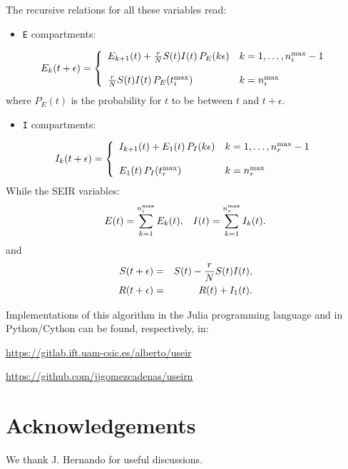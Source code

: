 \documentclass[10pt,letterpaper]{article}
\begin{document}
The recursive relations for all these variables read:
\begin{itemize}
\item \texttt{E} compartments:
\end{itemize}
\begin{equation}
E_k(t+\epsilon) = \left \{
\begin{array}{ll}
E_{k+1}(t) + {r\over N}S(t)I(t)\, P_E(k\epsilon) & k=1,\dots,n_i^{\rm max}-1\\
& \\
{r\over N}S(t)I(t)\, P_E(t_i^{\rm max}) & k=n^{\rm max}_i \\
\end{array}
\right.
\end{equation}
where \(P_E(t)\) is the probability for \(t\) to be between \(t\) and
\(t+\epsilon\). 
\begin{itemize}
\item \texttt{I} compartments:
\end{itemize}
\begin{equation}
I_k(t+\epsilon) = \left \{
\begin{array}{ll}
I_{k+1}(t) + E_{1}(t)\, P_I(k\epsilon) & k=1,\dots,n_r^{\rm max}-1\\
& \\
E_{1}(t)\, P_I(t_r^{\rm max}) & k=n_r^{\rm max} \\
\end{array}
\right.
\end{equation}
While the SEIR variables:
  \begin{eqnarray}
  E(t) = \sum_{k=1}^{n_i^{\rm max}} E_k(t), \;\;\;
  I(t) = \sum_{k=1}^{n_r^{\rm max}} I_k(t). 
  \end{eqnarray}
  and 
  \begin{eqnarray}
  S(t+\epsilon) &=& S(t) - {r\over N} S(t) I(t),\nonumber\\
  R(t+\epsilon) &=& R(t) + I_{1}(t). 
  \end{eqnarray}

Implementations of this algorithm in the Julia programming language and in Python/Cython can be found, respectively, in:

\vspace{2mm}
\hspace{5mm}\url{https://gitlab.ift.uam-csic.es/alberto/useir}

\hspace{5mm}\url{https://github.com/jjgomezcadenas/useirn} 










\section*{Acknowledgements}
We thank J. Hernando for useful discussions. 



\end{document}
